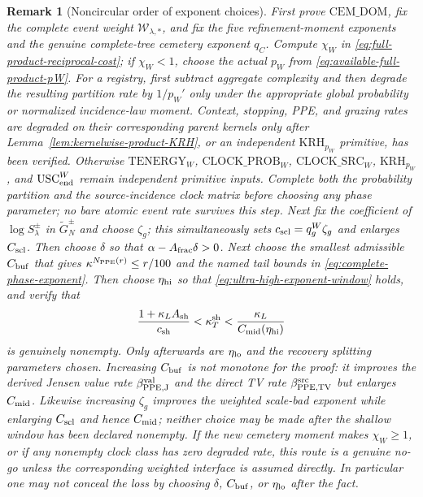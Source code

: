 \documentclass[11pt]{article}
\newtheorem{remark}[theorem]{Remark}
\begin{document}
\begin{remark}[Noncircular order of exponent choices]
\label{rem:parameter-selection-order}
First prove $\mathrm{CEM\_DOM}$, fix the complete event weight
$\mathscr W_{\lambda,*}$, and fix the five refinement-moment exponents and
the genuine complete-tree cemetery exponent $q_C$.  Compute $\chi_W$ in
\eqref{eq:full-product-reciprocal-cost}; if $\chi_W<1$, choose the actual
$p_W$ from \eqref{eq:available-full-product-pW}.  For a registry, first
subtract aggregate complexity and then degrade the resulting partition rate
by $1/p_W'$ only under the appropriate global probability or normalized
incidence-law moment.  Context, stopping, PPE, and grazing rates are degraded
on their corresponding parent kernels only after
Lemma~\ref{lem:kernelwise-product-KRH}, or an independent
$\mathrm{KRH}_{p_W}$ primitive, has been verified.  Otherwise
$\mathrm{TENERGY}_{W}$,
$\mathrm{CLOCK\_PROB}_{W}$, $\mathrm{CLOCK\_SRC}_{W}$,
$\mathrm{KRH}_{p_W}$, and $\mathrm{USC}_{\rm end}^{W}$ remain independent
primitive inputs.  Complete both the probability partition and the
source-incidence clock matrix before choosing any phase parameter; no bare
atomic event rate survives this step.  Next fix the coefficient
of $\log S_\lambda^\pm$ in
$\widetilde G_N^\pm$ and choose $\zeta_g$; this simultaneously sets
$c_{\rm scl}=q_g^W\zeta_g$ and enlarges $C_{\rm scl}$.  Then choose $\delta$
so that $\alpha-A_{\rm frac}\delta>0$.  Next choose
the smallest admissible $C_{\rm buf}$ that gives
$\kappa^{N_{\rm PPE}(r)}\le r/100$ and the named tail bounds in
\eqref{eq:complete-phase-exponent}.  Then choose $\eta_{\rm hi}$ so that
\eqref{eq:ultra-high-exponent-window} holds, and verify that
\[
 \frac{1+\kappa_LA_{\rm sh}}{c_{\rm sh}}
 <\kappa_T^{\rm sh}<
 \frac{\kappa_L}{C_{\rm mid}(\eta_{\rm hi})}
\]
is genuinely nonempty.  Only afterwards are $\eta_{\rm lo}$ and the recovery
splitting parameters chosen.  Increasing $C_{\rm buf}$ is not monotone for
the proof: it improves the derived Jensen value rate
$\beta_{\rm PPE,J}^{\rm val}$ and the direct TV rate
$\beta_{\rm PPE,TV}^{\rm src}$ but enlarges $C_{\rm mid}$.
Likewise increasing $\zeta_g$ improves the weighted scale-bad exponent while
enlarging $C_{\rm scl}$ and hence $C_{\rm mid}$; neither choice may be made
after the shallow window has been declared nonempty.
If the new cemetery moment makes $\chi_W\ge1$, or if any nonempty clock
class has zero degraded rate, this route is a genuine no-go unless the
corresponding weighted interface is assumed directly.  In particular one
may not conceal the loss by choosing $\delta$, $C_{\rm buf}$, or
$\eta_{\rm lo}$ after the fact.
\end{remark}
\end{document}
